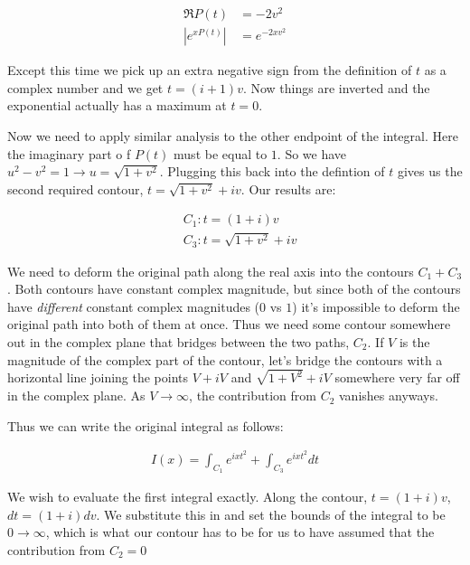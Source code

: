 \documentclass[paper=a4, fontsize=11pt]{scrartcl} %
\numberwithin{equation}{section} %
\numberwithin{figure}{section} %
\numberwithin{table}{section} %
\begin{document}
\begin{align}
\Re{P(t)} &= -2v^2 \\
|e^{xP(t)}| &= e^{-2xv^2} 
\end{align} 

Except this time we pick up an extra negative sign from the definition of $t$ as a complex number and we get $t = (i + 1)v$. Now things are inverted and the exponential actually has a maximum at $t=0$.

\hspace{2mm}

Now we need to apply similar analysis to the other endpoint of the integral. Here the imaginary part o f $P(t)$ must be equal to $1$. So we have $u^2 - v^2 = 1 \rightarrow u = \sqrt{1 + v^2}$. Plugging this back into the defintion of $t$ gives us the second required contour, $t = \sqrt{1 + v^2} + iv$. Our results are:

\begin{align}
&C_1: t = (1+i)v \\
&C_3: t = \sqrt{1 + v^2} + iv
\end{align}

We need to deform the original path along the real axis into the contours $C_1 + C_3$. Both contours have constant complex magnitude, but since both of the contours have \textit{different} constant complex magnitudes ($0$ vs $1$) it's impossible to deform the original path into both of them at once. Thus we need some contour somewhere out in the complex plane that bridges between the two paths, $C_2$. If $V$ is the magnitude of the complex part of the contour, let's bridge the contours with a horizontal line joining the points $V + iV$ and $\sqrt{1 + V^2} + iV$ somewhere very far off in the complex plane. As $V\rightarrow \infty$, the contribution from $C_2$ vanishes anyways.

\hspace{2mm}

Thus we can write the original integral as follows:

\begin{align}
I(x) = \int_{C_1} e^{i x t^2} + \int_{C_3} e^{i x t^2} dt
\end{align}

We wish to evaluate the first integral exactly. Along the contour, $t = (1 + i)v$, $dt = (1 + i)dv$. We substitute this in and set the bounds of the integral to be $0 \rightarrow \infty$, which is what our contour has to be for us to have assumed that the contribution from $C_2 = 0$
\end{document}
